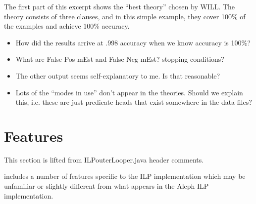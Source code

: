 \documentclass{article}
\begin{document}
The first part of this excerpt shows the ``best theory'' chosen by WILL.  The theory consists of three clauses, and in this simple example, they cover 100\% of the examples and achieve 100\% accuracy. 

\begin{rfc}
\begin{itemize}
\item How did the results arrive at .998 accuracy when we know accuracy is 100\%?
\item What are False Pos mEst and False Neg mEst? stopping conditions?
\item The other output seems self-explanatory to me.  Is that reasonable?
\item Lots of the ``modes in use'' don't appear in the theories.  Should we explain this, i.e. these are just predicate heads that exist somewhere in the data files?
\end{itemize}
\end{rfc}

\section{\will Features}

\begin{rfc}
This section is lifted from ILPouterLooper.java header comments.
\end{rfc}

\will includes a number of features specific to the \will ILP implementation which may be unfamiliar or slightly different from what appears in the Aleph ILP implementation.~\cite{ilpouterloop} 
\end{document}
